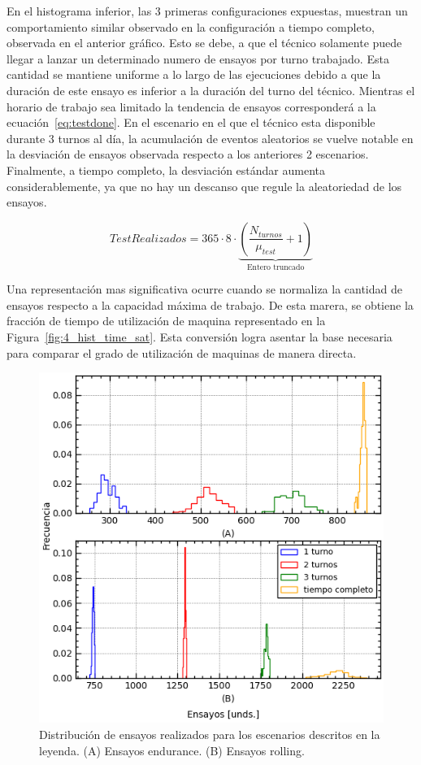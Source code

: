 En el histograma inferior,
las 3 primeras configuraciones expuestas,
muestran un comportamiento similar observado en
la configuración a tiempo completo, observada en el anterior gráfico.
Esto se debe, a que el técnico solamente puede llegar a lanzar
un determinado numero de ensayos por turno trabajado.
Esta cantidad se mantiene uniforme a lo largo de las ejecuciones
debido a que la duración de este ensayo es inferior
a la duración del turno del técnico.
Mientras el horario de trabajo sea limitado
la tendencia de ensayos corresponderá a la ecuación~\ref{eq:testdone}.
En el escenario en el que el técnico esta disponible durante 3 turnos al día,
la acumulación de eventos aleatorios se vuelve notable
en la desviación de ensayos observada respecto a los anteriores 2 escenarios.
Finalmente, a tiempo completo, la desviación estándar
aumenta considerablemente, ya que no hay un descanso
que regule la aleatoriedad de los ensayos.

\begin{equation}
	Test Realizados = 365 \cdot 8 \cdot 
	\underbrace{
		\left(\frac{N_{turnos}}{\mu_{test}} + 1\right)
	}_{\text{Entero truncado}}
	\label{eq:testdone}
\end{equation}

Una representación mas significativa ocurre
cuando se normaliza la cantidad de ensayos respecto
a la capacidad máxima de trabajo.
De esta marera, se obtiene la fracción de tiempo de utilización de maquina
representado en la Figura~\ref{fig:4_hist_time_sat}.
Esta conversión logra asentar la base necesaria para
comparar el grado de utilización de maquinas de manera directa.

\begin{figure}
	\begin{center}
		\includegraphics{fig/4_hist_tests_done}
	\end{center}
	\caption{Distribución de ensayos realizados para los escenarios descritos en la leyenda.
	(A) Ensayos endurance. (B) Ensayos rolling.}
	\label{fig:4_hist_tests_done}
\end{figure}

